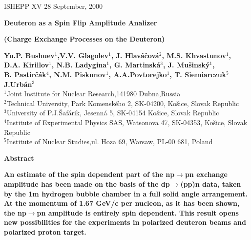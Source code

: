 \documentclass[a4paper,12pt]{article}
\begin{document}
\hspace*{7cm} ISHEPP XV 28 September, 2000
\vspace*{5mm}

\begin{flushleft}
  {\Large\bf Deuteron as a Spin Flip Amplitude Analizer}

  {\large\bf (Charge Exchange Processes on the Deuteron)}
\end{flushleft}
\bigskip
    {\large\bf
      Yu.P. Bushuev$^{1}$,V.V. Glagolev$^{1}$, J. Hlav\'{a}\v{c}ov\'{a}$^{2}$,
      M.S. Khvastunov$^{1}$,\\D.A. Kirillov$^{1}$,
      N.B. Ladygina$^{1}$, G. Martinsk\'{a}$^{3}$, J. Mu\v sinsk\'y$^{1}$,\\
      B. Pastir\v c\'ak$^{4}$, N.M. Piskunov$^{1}$, A.A.Povtorejko$^{1}$, T. Siemiarczuk$^{5}$
      J.Urb\'{a}n$^{3}$ }\\

    \bigskip
    \hspace{-0.75cm}
    \small{$^{1}$Joint Institute for Nuclear Research,141980 Dubna,Russia\\
      $^{2}$Technical University, Park Komensk\'{e}ho 2, SK-04200, Ko\v{s}ice, Slovak Republic\\
      $^{3}$University of P.J.\v{S}af\'{a}rik, Jesenn\'{a} 5, SK-04154 Ko\v{s}ice, Slovak Republic \\
      $^{4}$Institute of Experimental Physics SAS, Watsonova 47, SK-04353, Ko\v{s}ice, Slovak Republic \\
      $^{5}$Institute of Nuclear Studies,ul. Hoza 69, Warsaw,  PL-00 681, Poland
      \\}

    \bigskip

    \begin{center}
      {\LARGE\bf Abstract}
    \end{center}
    \noindent
    \baselineskip=0.7cm
    \vspace*{1mm}

    {\large\bf An estimate of the spin dependent part of the np$\to$pn exchange
      amplitude has been made on the basis of the dp$\to$(pp)n data, taken
      by the 1m hydrogen bubble chamber in a full solid angle arrangement.
      At the momentum of 1.67 GeV/c per nucleon, as it has been shown, the
      np$\to$pn amplitude is entirely spin dependent. This result opens
      new possibilities for the experiments in polarized deuteron beams and
      polarized proton target.}
\end{document}
